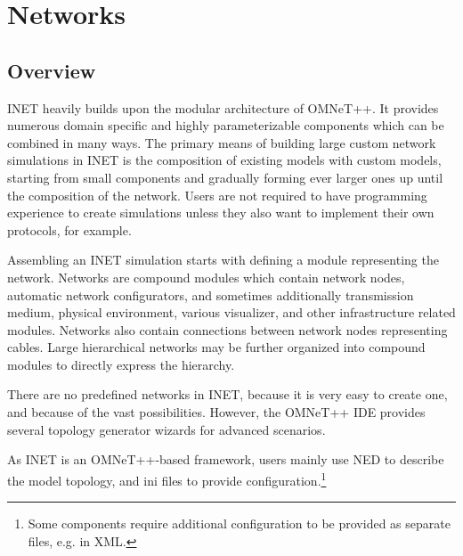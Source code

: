 \chapter{Networks}
\label{cha:networks}

%
%

\section{Overview}
\label{sec:networks:overview}


INET heavily builds upon the modular architecture of OMNeT++. It provides
numerous domain specific and highly parameterizable components which can be
combined in many ways. The primary means of building large custom network
simulations in INET is the composition of existing models with custom models,
starting from small components and gradually forming ever larger ones up until
the composition of the network. Users are not required to have programming
experience to create simulations unless they also want to implement
their own protocols, for example.

Assembling an INET simulation starts with defining a module representing
the network. Networks are compound modules which contain network nodes,
automatic network configurators, and sometimes additionally transmission
medium, physical environment, various visualizer, and other infrastructure
related modules. Networks also contain connections between network nodes
representing cables. Large hierarchical networks may be further organized
into compound modules to directly express the hierarchy.

There are no predefined networks in INET, because it is very easy to create
one, and because of the vast possibilities. However, the OMNeT++ IDE provides
several topology generator wizards for advanced scenarios.

As INET is an OMNeT++-based framework, users mainly use NED to describe the
model topology, and ini files to provide configuration.\footnote{Some
components require additional configuration to be provided as separate
files, e.g. in XML.}

